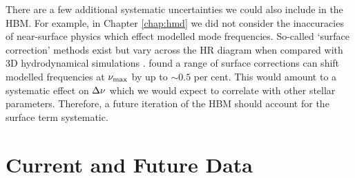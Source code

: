 There are a few additional systematic uncertainties we could also include in the HBM. For example, in Chapter \ref{chap:hmd} we did not consider the inaccuracies of near-surface physics which effect modelled mode frequencies. So-called `surface correction' methods exist \citep[e.g.][]{Ball.Gizon2014,Kjeldsen.Bedding.ea2008} but vary across the HR diagram when compared with 3D hydrodynamical simulations \citep{Sonoi.Samadi.ea2015}. \citet{Compton.Bedding.ea2018} found a range of surface corrections can shift modelled frequencies at \({\nu_\mathrm{max}}\) by up to \(\sim 0.5\) per cent. This would amount to a systematic effect on \({\Delta\nu}\) which we would expect to correlate with other stellar parameters. Therefore, a future iteration of the HBM should account for the surface term systematic.

\section*{Current and Future Data}



